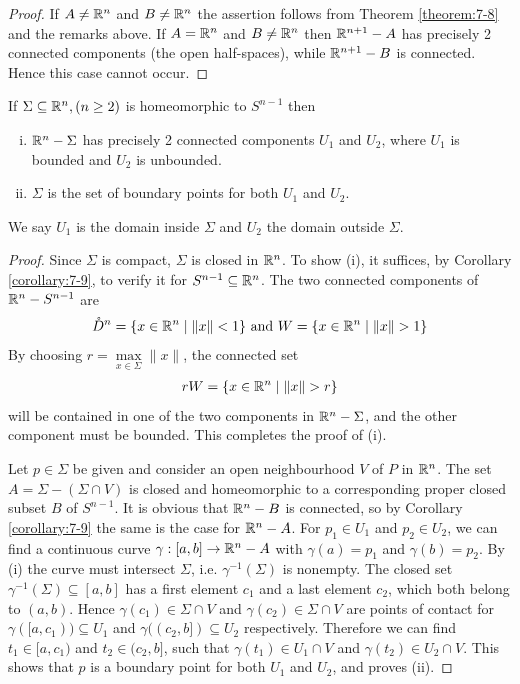 \begin{proof}
  If $A\neq {\ensuremath{\mathbb{R}}}^n$ and $B\neq {\ensuremath{\mathbb{R}}}^n$ the assertion follows from Theorem \ref{theorem:7-8} and 
  the remarks above. If $A= {\mathbb{R}}^n$ and $B\neq {\ensuremath{\mathbb{R}}}^n$ then ${\mathbb{R}}^{n+1}-A$ has precisely 2 connected
  components (the open half-spaces), while ${\mathbb{R}}^{n+1} - B$ is connected. Hence this case 
  cannot occur.
\end{proof}


\begin{theorem}\label{theorem:7-10}
  If $\Sigma\subseteq{\ensuremath{\mathbb{R}}}^n, (n\ge 2)$ is homeomorphic to $S^{n-1}$ then 
  \begin{enumerate}[(i)]
    \item ${\mathbb{R}}^n-\Sigma$ has precisely 2 connected components $U_1$ and $U_2$, where 
      $U_1$ is bounded and $U_2$ is unbounded.
    \item $\Sigma$ is the set of boundary points for both $U_1$ and $U_2$.
  \end{enumerate}
  We say $U_1$ is the domain inside $\Sigma$ and $U_2$ the domain outside $\Sigma$.
\end{theorem}

\begin{proof}
  Since $\Sigma$ is compact, $\Sigma$ is closed in ${\mathbb{R}}^n$. To show (i), it suffices, by Corollary
  \ref{corollary:7-9}, to verify it for $S^{n-1}\subseteq{\ensuremath{\mathbb{R}}}^n$. The two connected components of ${\mathbb{R}}^n-S^{n-1}$
  are 
  \begin{align*}
    \mathring D^n = \{x\in \RR^n \mid \|x\|<1 \} \text{ and } W = \{x\in\RR^n\mid \|x\|>1\}
  \end{align*}
  By choosing $r=\max\limits_{x\in\Sigma}\|x\|$, the connected set 
  \begin{align*}
    rW = \{x\in\RR^n \mid \|x\|>r\}
  \end{align*}
  will be contained in one of the two components in ${\mathbb{R}}^n-\Sigma$, and the other component
must be bounded. This completes the proof of (i).

  Let $p\in\Sigma$ be given and consider an open neighbourhood $V$ of $P$ in ${\mathbb{R}}^n$. The set
  $A=\Sigma-(\Sigma\cap V)$ is closed and homeomorphic to a corresponding proper closed
  subset $B$ of $S^{n-1}$. It is obvious that ${\mathbb{R}}^n-B$ is connected, so by Corollary \ref{corollary:7-9}
  the same is the case for ${\mathbb{R}}^n-A$. For $p_1\in U_1$ and $p_2\in U_2$, we can find a continuous curve 
  $\gamma:[a, b]\to{\ensuremath{\mathbb{R}}}^n-A$ with $\gamma(a)=p_1$ and $\gamma(b)=p_2$. By (i) the curve must intersect 
  $\Sigma$, i.e. $\gamma^{-1}(\Sigma)$ is nonempty. The closed set $\gamma^{-1}(\Sigma)\subseteq[a, b]$ has 
  a first element $c_1$ and a last element $c_2$, which both belong to $(a, b)$. Hence $\gamma(c_1)\in\Sigma\cap V$
  and $\gamma(c_2)\in\Sigma\cap V$ are points of contact for $\gamma([a, c_1))\subseteq U_1$ and 
  $\gamma((c_2,b])\subseteq U_2$ respectively. Therefore we can find $t_1\in [a, c_1)$ and $t_2\in(c_2, b]$,
  such that $\gamma(t_1)\in U_1\cap V$ and $\gamma(t_2)\in U_2\cap V$. This shows that $p$ is a boundary
  point for both $U_1$ and $U_2$, and proves (ii).
\end{proof}

